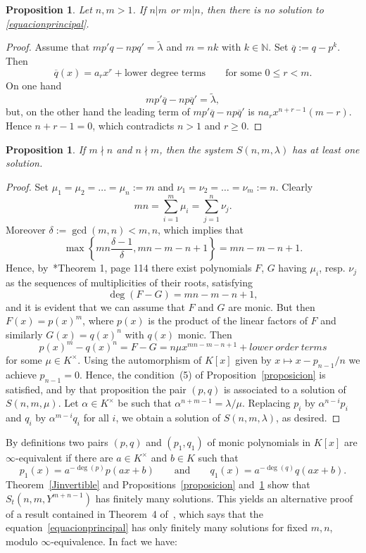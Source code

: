 \documentclass[reqno,a4paper]{amsart}
\newtheorem{proposition}[theorem]{Proposition}
\theoremstyle{definition}
\theoremstyle{remark}
\newcommand{\ov}{\overline}
\newcommand{\wt}{\widetilde}
\begin{document}
\begin{proposition}\label{proposicion1} Let $n,m>1$. If $n|m$ or $m|n$, then there is no
solution to \eqref{equacionprincipal}.
\end{proposition}

\begin{proof} Assume that $mp'q-npq' = \wt{\lambda}$ and $m=nk$ with $k\in \mathds{N}$.
Set $\ov{q}:=q-p^k$. Then
$$
\ov{q}(x)=a_r x^r+\text{lower degree terms}\qquad\text{for some $0\le r<m$.}
$$
On one hand
$$
mp'\ov{q}-np\ov{q}'=\wt{\lambda},
$$
but, on the other hand the leading term of $mp'\ov{q}-np\ov{q}'$ is $n a_r x^{n+r-1}(m-r)$.
Hence $n+r-1=0$, which contradicts $n>1$ and $r\ge 0$.
\end{proof}

\begin{proposition}\label{zannier}
If $m\nmid n$ and $n\nmid m$, then the system $S(n,m,\lambda)$ has at least one solution.
\end{proposition}

\begin{proof}
Set $\mu_1=\mu_2=\dots=\mu_n:=m$ and $\nu_1=\nu_2=\dots=\nu_m:=n$. Clearly
$$
mn=\sum_{i=1}^{m}\mu_i=\sum_{j=1}^{n}\nu_j.
$$
Moreover $\delta:=\gcd(m,n)<m,n$, which implies that
$$
\max\left\{mn\frac{\delta-1}{\delta},mn-m-n+1\right\}=mn-m-n+1.
$$
Hence, by~\cite{Z}*{Theorem 1, page 114} there exist polynomials $F$, $G$ having
$\mu_i$, resp. $\nu_j$  as the sequences of multiplicities
of their roots, satisfying
$$
\deg(F-G)=mn-m-n+1,
$$
and it is evident that we can assume that $F$ and $G$ are monic.
But then $F(x)=p(x)^m$, where $p(x)$ is the product of the linear factors of $F$ and similarly
$G(x)=q(x)^n$ with $q(x)$ monic. Then
$$
p(x)^m-q(x)^n=F-G= n\mu x^{mn-m-n+1}+lower\ order\ terms
$$
for some $\mu\in K^{\times}$.
Using the automorphism of $K[x]$ given by $x\mapsto x-p_{n-1}/n$ we achieve $p_{n-1}=0$.
Hence, the condition~(5) of Proposition~\ref{proposicion} is satisfied, and by that
proposition the pair $(p,q)$ is associated to a solution of $S(n,m,\mu)$.
Let $\alpha\in K^{\times}$ be such that $\alpha^{n+m-1}=\lambda/\mu$. Replacing $p_i$ by $\alpha^{n-i}p_i$ and
$q_i$ by $\alpha^{m-i}q_i$ for all $i$, we obtain a solution of $S(n,m,\lambda)$, as desired.
\end{proof}

By definitions two pairs $(p,q)$ and $(p_1,q_1)$ of monic polynomials in $K[x]$ are
$\infty$-equivalent if there are $a\in K^{\times}$ and $b\in K$ such that
$$
p_1(x) = a^{-\deg(p)} p(a x +b)\qquad\text{and}\qquad q_1(x) = a^{-\deg(q)} q(a x +b).
$$
Theorem~\ref{Jinvertible} and Propositions~\ref{proposicion} and~\ref{proposicion1} show that
$S_t(n,m,Y^{m+n-1})$ has finitely many solutions. This yields an alternative proof
of a result contained in Theorem~4 of~\cite{F}, which says that the
equation~\eqref{equacionprincipal} has only finitely many solutions for fixed $m,n$,
modulo $\infty$-equivalence. In fact we have:
\end{document}
